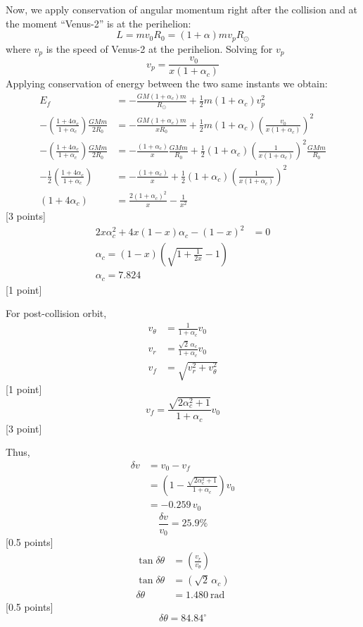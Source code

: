 \begin{description}
  Now, we apply conservation of angular momentum right after the collision and
  at the moment ``Venus-2'' is at the perihelion:
  \[
    L = mv_0R_0 = (1 + \alpha)mv_pR_\odot
  \]
  where $v_p$ is the speed of Venus-2 at the perihelion. Solving for $v_p$
  \[
    v_p = \frac{v_0}{x(1 + \alpha_c)}
  \]
  Applying conservation of energy between the two same instants we obtain:
  \begin{align*}
    E_f &= -\frac{GM(1 + \alpha_c)m}{R_\odot}
      + \frac{1}{2}m(1 + \alpha_c)v_p^2 \\
    -\left(\frac{1 + 4\alpha_c}{1 + \alpha_c}\right)\frac{GMm}{2R_0}
      &= -\frac{GM(1 + \alpha_c)m}{xR_0}
      + \frac{1}{2}m(1 + \alpha_c)
        \left(\frac{v_0}{x(1 + \alpha_c)}\right)^2 \\
    -\left(\frac{1 + 4\alpha_c}{1 + \alpha_c}\right)\frac{GMm}{2R_0}
      &= -\frac{(1 + \alpha_c)}{x}\frac{GMm}{R_0}
      + \frac{1}{2}(1 + \alpha_c)
        \left(\frac{1}{x(1 + \alpha_c)}\right)^2\frac{GMm}{R_0} \\
    -\frac{1}{2}\left(\frac{1 + 4\alpha_c}{1 + \alpha_c}\right)
      &= -\frac{(1 + \alpha_c)}{x}
      + \frac{1}{2}(1 + \alpha_c)
        \left(\frac{1}{x(1 + \alpha_c)}\right)^2 \\
    (1 + 4\alpha_c) &= \frac{2(1 + \alpha_c)^2}{x} - \frac{1}{x^2}
  \end{align*}
  \hfill[3 points]
  \begin{align*}
    2x\alpha_c^2 + 4x(1 - x)\alpha_c - (1 - x)^2 &= 0 \\
    \alpha_c = (1 - x)\left(\sqrt{1 + \frac{1}{2x}} - 1\right) & \\
    \alpha_c = 7.824 &
  \end{align*}
  \hfill[1 point]

\item[14.8] For post-collision orbit,
  \begin{align*}
    v_\theta &= \frac{1}{1 + \alpha_c}v_0 \\
    v_r &= \frac{\sqrt{2}\,\alpha_c}{1 + \alpha_c}v_0 \\
    v_f &= \sqrt{v_r^2 + v_\theta^2}
  \end{align*}
  \hfill[1 point]
  \[
    v_f = \frac{\sqrt{2\alpha_c^2 + 1}}{1 + \alpha_c}v_0
  \]
  \hfill[3 point] %

  Thus,
  \begin{align*}
    \delta v &= v_0 - v_f \\
      &= \left(1 - \frac{\sqrt{2\alpha_c^2 + 1}}{1 + \alpha_c}\right)v_0 \\
      &= -0.259\,v_0
  \end{align*}
  \[
    \frac{\delta v}{v_0} = 25.9\%
  \]
  \hfill[0.5 points]
  \begin{align*}
    \tan\delta\theta &= \left(\frac{v_r}{v_\theta}\right) \\
    \tan\delta\theta &= \left(\sqrt{2}\,\alpha_c\right) \\
    \delta\theta &= 1.480\ \mathrm{rad}
  \end{align*}
  \hfill[0.5 points]
  \[
    \delta\theta = 84.84^\circ
  \]
\end{description}

